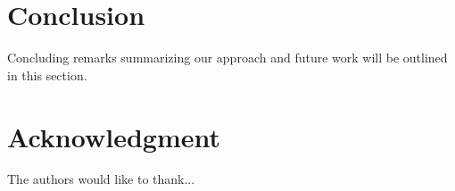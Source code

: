 \documentclass[conference]{IEEEtran}
\begin{document}
\IEEEpeerreviewmaketitle







\section{Conclusion}
Concluding remarks summarizing our approach and future work will be outlined in this section.

\section*{Acknowledgment}

The authors would like to thank...






\end{document}
